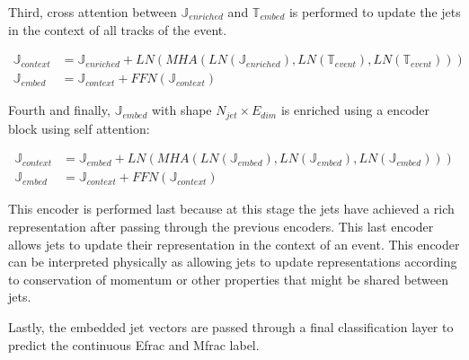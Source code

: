 Third, cross attention between $\mathbb{J}_{enriched}$ and $\mathbb{T}_{embed}$ is performed to update the jets in the context of all tracks of the event.

\begin{align}
    \mathbb{J}_{context} &= \mathbb{J}_{enriched} + LN(MHA(LN(\mathbb{J}_{enriched}), LN(\mathbb{T}_{event}), LN(\mathbb{T}_{event}))) \\
    \mathbb{J}_{embed} &= \mathbb{J}_{context} + FFN (\mathbb{J}_{context})
\end{align}


Fourth and finally, $\mathbb{J}_{embed}$ with shape $N_{jet} \times E_{dim}$ is enriched using a encoder block using self attention:

\begin{align}
    \mathbb{J}_{context} &= \mathbb{J}_{embed} + LN(MHA(LN(\mathbb{J}_{embed}), LN(\mathbb{J}_{embed}), LN(\mathbb{J}_{embed}))) \\
    \mathbb{J}_{embed} &= \mathbb{J}_{context} + FFN (\mathbb{J}_{context})
\end{align}

This encoder is performed last because at this stage the jets have achieved a rich representation after passing through the previous encoders. This last encoder allows jets to update their representation in the context of an event. This encoder can be interpreted physically as allowing jets to update representations according to conservation of momentum or other properties that might be shared between jets.

Lastly, the embedded jet vectors are passed through a final classification layer to predict the continuous Efrac and Mfrac label.
\fi
